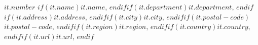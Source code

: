 \textbf{$it.number$} $if(it.name)$$it.name$, $endif$$if(it.department)$$it.department$, $endif$$if(it.address)$$it.address$, $endif$$if(it.city)$$it.city$, $endif$$if(it.postal-code)$$it.postal-code$, $endif$$if(it.region)$$it.region$, $endif$$if(it.country)$$it.country$, $endif$$if(it.url)$$it.url$, $endif$

